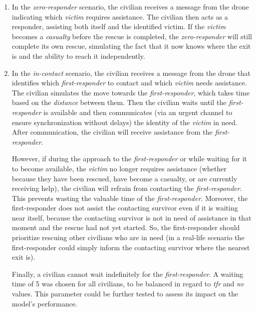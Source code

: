 \begin{enumerate}
	\begin{enumerate}
		\item In the \textit{zero-responder} scenario, the civilian receives a message from the drone indicating which \textit{victim} requires assistance. The civilian then acts as a responder, assisting both itself and the identified victim. If the \textit{victim} becomes a \textit{casualty} before the rescue is completed, the \textit{zero-responder} will still complete its own rescue, simulating the fact that it now knows where the exit is and the ability to reach it independently.
		
		\item In the \textit{in-contact} scenario, the civilian receives a message from the drone that identifies which \textit{first-responder} to contact and which \textit{victim} needs assistance. The civilian simulates the move towards the \textit{first-responder}, which takes time based on the \textit{distance} between them. Then the civilian waits until the \textit{first-responder} is available and then communicates (via an urgent channel to ensure synchronization without delays) the identity of the \textit{victim} in need. After communication, the civilian will receive assistance from the \textit{first-responder}.
		
		However, if during the approach to the \textit{first-responder} or while waiting for it to become available, the \textit{victim} no longer requires assistance (whether because they have been rescued, have become a casualty, or are currently receiving help), the civilian will refrain from contacting the \textit{first-responder}. This prevents wasting the valuable time of the \textit{first-responder}. Moreover, the first-responder does not assist the contacting survivor even if it is waiting near itself, because the contacting survivor is not in need of assistance in that moment and the rescue had not yet started. So, the first-responder should prioritize rescuing other civilians who are in need (in a real-life scenario the first-responder could simply inform the contacting survivor where the nearest exit is).
		
		Finally, a civilian cannot wait indefinitely for the \textit{first-responder}. A waiting time of 5 was chosen for all civilians, to be balanced in regard to \textit{tfr} and \textit{nv} values. This parameter could be further tested to assess its impact on the model's performance.
	\end{enumerate}
\end{enumerate}


